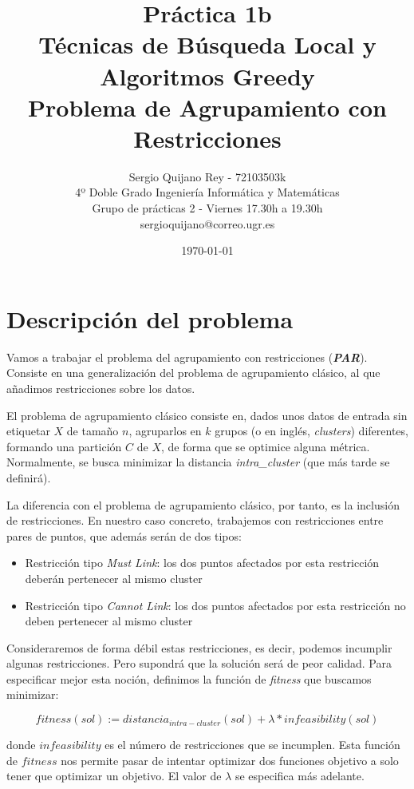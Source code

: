 \documentclass[11pt]{article}
\title{
    {Práctica 1b}\\
    {Técnicas de Búsqueda Local y Algoritmos Greedy}\\
    {Problema de Agrupamiento con Restricciones}\\
}
\author{
    {Sergio Quijano Rey - 72103503k}\\
    {4º Doble Grado Ingeniería Informática y Matemáticas}\\
    {Grupo de prácticas 2 - Viernes 17.30h a 19.30h}\\
    {sergioquijano@correo.ugr.es}
}
\date{\today}
\begin{document}
\maketitle
\pagebreak

\tableofcontents
\pagebreak

\section{Descripción del problema}

Vamos a trabajar el problema del agrupamiento con restricciones (\textbf{\emph{PAR}}). Consiste en una generalización del problema de agrupamiento clásico, al que añadimos restricciones sobre los datos.

El problema de agrupamiento clásico consiste en, dados unos datos de entrada sin etiquetar $X$ de tamaño $n$, agruparlos en $k$ grupos (o en inglés, \emph{clusters}) diferentes, formando una partición $C$ de $X$, de forma que se optimice alguna métrica. Normalmente, se busca minimizar la distancia \emph{intra\_cluster} (que más tarde se definirá).

La diferencia con el problema de agrupamiento clásico, por tanto, es la inclusión de restricciones. En nuestro caso concreto, trabajemos con restricciones entre pares de puntos, que además serán de dos tipos:

\begin{itemize}
    \item Restricción tipo \emph{Must Link}: los dos puntos afectados por esta restricción deberán pertenecer al mismo cluster
    \item Restricción tipo \emph{Cannot Link}: los dos puntos afectados por esta restricción no deben pertenecer al mismo cluster
\end{itemize}

Consideraremos de forma débil estas restricciones, es decir, podemos incumplir algunas restricciones. Pero supondrá que la solución será de peor calidad. Para especificar mejor esta noción, definimos la función de \emph{fitness} que buscamos minimizar:

\begin{displaymath}
    fitness(sol) := distancia_{intra-cluster}(sol) + \lambda * infeasibility(sol)
\end{displaymath}

donde $infeasibility$ es el número de restricciones que se incumplen. Esta función de $fitness$ nos permite pasar de intentar optimizar dos funciones objetivo a solo tener que optimizar un objetivo. El valor de $\lambda$ se especifica más adelante.
\end{document}
